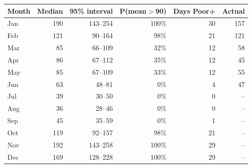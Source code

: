 \begin{tabular}{|l|r|r|r|r|r|}
\hline
\textbf{Month} & \textbf{Median} & \textbf{95\% interval} & \textbf{P(mean$>$90)} & \textbf{Days Poor+} & \textbf{Actual} \\\hline
Jan & 190 & 143--254 & 100\% & 30 & 157 \\\hline
Feb & 121 & 90--164 & 98\% & 21 & 121 \\\hline
Mar & 85 & 66--109 & 32\% & 12 & 58 \\\hline
Apr & 86 & 67--112 & 35\% & 12 & 45 \\\hline
May & 85 & 67--109 & 33\% & 12 & 55 \\\hline
Jun & 63 & 48--81 & 0\% & 4 & 47 \\\hline
Jul & 39 & 30--50 & 0\% & 0 & -- \\\hline
Aug & 36 & 28--46 & 0\% & 0 & -- \\\hline
Sep & 45 & 35--59 & 0\% & 1 & -- \\\hline
Oct & 119 & 92--157 & 98\% & 21 & -- \\\hline
Nov & 192 & 143--258 & 100\% & 29 & -- \\\hline
Dec & 169 & 128--228 & 100\% & 29 & -- \\\hline
\end{tabular}
